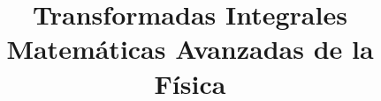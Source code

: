 
\usepackage{standalone}
\usepackage{mathrsfs}
\usepackage{bigints}
\newtheorem{defi}{{\textit{Definición}}}[section]
\newtheorem{teo}{{\textit{Teorema}}}[section]
\newcommand{\saltosin}{\nonumber \\}
\newcommand{\comillado}[1]{``#1''}
\title{Transformadas Integrales \\ {\large Matemáticas Avanzadas de la Física}}
\date{ }

\renewcommand\labelenumii{\theenumi.{\arab{enumii}}}
\maketitle
\fontsize{14}{14}\selectfont
